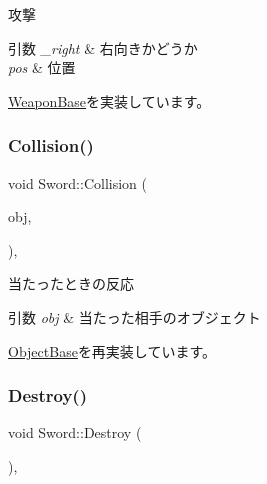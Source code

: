 攻撃 


\begin{DoxyParams}{引数}
{\em \+\_\+right} & 右向きかどうか \\
\hline
{\em pos} & 位置 \\
\hline
\end{DoxyParams}


\mbox{\hyperlink{class_weapon_base_a8663cb6d8510d5b3aff1129c575cbd9c}{Weapon\+Base}}を実装しています。

\mbox{\label{class_sword_acb6e5846afb674bc1ec47dcfee0a6bd3}} 
\subsubsection{\texorpdfstring{Collision()}{Collision()}}
{\footnotesize\ttfamily void Sword\+::\+Collision (\begin{DoxyParamCaption}\item[{\mbox{\hyperlink{class_object_base}{Object\+Base}} $\ast$}]{obj,  }\item[{\mbox{\hyperlink{common_8h_afb0c5e21d4133ff4f200992c0b534e1b}{V\+E\+C2}}}]{ }\end{DoxyParamCaption})\hspace{0.3cm}{\ttfamily [final]}, {\ttfamily [virtual]}}



当たったときの反応 


\begin{DoxyParams}{引数}
{\em obj} & 当たった相手のオブジェクト \\
\hline
\end{DoxyParams}


\mbox{\hyperlink{class_object_base_ad772d7a42f5e46c39481f5db22ee8193}{Object\+Base}}を再実装しています。

\mbox{\label{class_sword_a8473b694775374df4d9b6305cfa82293}} 
\subsubsection{\texorpdfstring{Destroy()}{Destroy()}}
{\footnotesize\ttfamily void Sword\+::\+Destroy (\begin{DoxyParamCaption}{ }\end{DoxyParamCaption})\hspace{0.3cm}{\ttfamily [inline]}, {\ttfamily [virtual]}}



